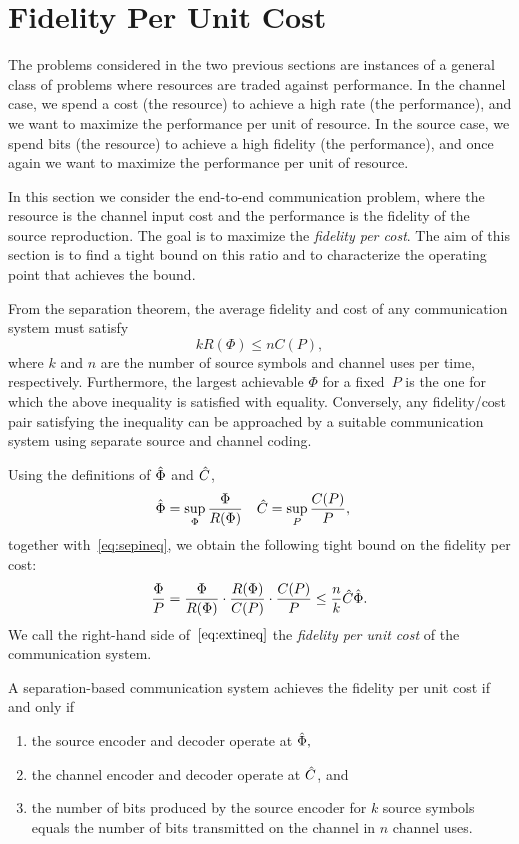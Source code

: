 \section{Fidelity Per Unit Cost}
\label{sec:fidcostbound}

The problems considered in the two previous sections are instances of a general
class of problems where resources are traded against performance.  In the
channel case, we spend a cost (the resource) to achieve a high rate
(the performance), and we want to maximize the
performance per unit of resource. In the source case, we spend bits (the
resource) to achieve a high fidelity (the performance), and once again we want
to maximize the performance per unit of resource.  

In this section we consider the end-to-end communication problem, where the
resource is the channel input cost and the performance is the fidelity of the
source reproduction. The goal is to maximize the \emph{fidelity per cost}. The
aim of this section is to find a tight bound on this ratio and  to characterize
the operating point that achieves the bound.

From the separation theorem, the average fidelity and cost of any communication
system must satisfy
\begin{equation}
  \label{eq:sepineq}
  k R(\Phi) \le n C(P),
\end{equation}
where $k$ and $n$ are the number of source symbols and channel uses per time,
respectively. Furthermore, the largest achievable $\Phi$ for a fixed~$P$ is the
one for which the above inequality is satisfied with equality.
Conversely, any fidelity/cost pair satisfying the inequality can
be approached by a suitable communication system using separate source and
channel coding.

Using the definitions of ${\hat{\Phi}}$ and ${\hat{C}}$,
\begin{align*}
  {\hat{\Phi}} &= \sup_\Phi \frac{\Phi}{R(\Phi)} & {\hat{C}} &= \sup_P \frac{C(P)}{P},
\end{align*}
together with~\eqref{eq:sepineq}, we obtain the following tight bound on the
fidelity per cost:
\begin{equation}
  \label{eq:extineq}
\frac\Phi P = \frac\Phi{R(\Phi)} \cdot \frac{R(\Phi)}{C(P)} \cdot
\frac{C(P)}{P} \le \frac nk {\hat{C}} {\hat{\Phi}}.
\end{equation}
We call the right-hand side of~$\eqref{eq:extineq}$ the \emph{fidelity per unit
cost} of the communication system.

A separation-based communication system achieves the fidelity per unit cost if
and only if 
\begin{enumerate}
\item the source encoder and decoder operate at ${\hat{\Phi}},$
\item the channel encoder and decoder operate at ${\hat{C}}$, and
\item the number of bits produced by the source encoder for $k$ source symbols
  equals the number of bits transmitted on the channel in $n$ channel uses. 
\end{enumerate}


